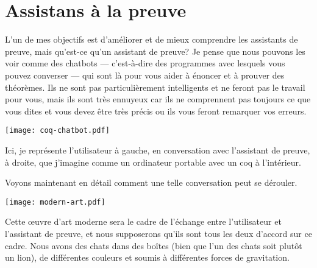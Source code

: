 %
\section{Assistans à la preuve}

L'un de mes objectifs est d'améliorer et de mieux comprendre les assistants de
preuve, mais qu'est-ce qu'un assistant de preuve?
Je pense que nous pouvons les voir comme des chatbots --- c'est-à-dire des
programmes avec lesquels vous pouvez converser --- qui sont là pour vous aider à
énoncer et à prouver des théorèmes.
Ils ne sont pas particulièrement intelligents et ne feront pas le travail pour
vous, mais ils sont très ennuyeux car ils ne comprennent pas toujours ce que
vous dites et vous devez être très précis ou ils vous feront remarquer vos
erreurs.

%
\begin{center}
  \texttt{[image: coq-chatbot.pdf]}
\end{center}

Ici, je représente l'utilisateur à gauche, en conversation avec l'assistant
de preuve, à droite, que j'imagine comme un ordinateur portable avec un coq à
l'intérieur.

Voyons maintenant en détail comment une telle conversation peut se dérouler.

\begin{center}
  \texttt{[image: modern-art.pdf]}
\end{center}

Cette œuvre d'art moderne sera le cadre de l'échange entre l'utilisateur et
l'assistant de preuve, et nous supposerons qu'ils sont tous les deux d'accord
sur ce cadre.
Nous avons des chats dans des boîtes (bien que l'un des chats soit plutôt un
lion), de différentes couleurs et soumis à différentes forces de gravitation.

